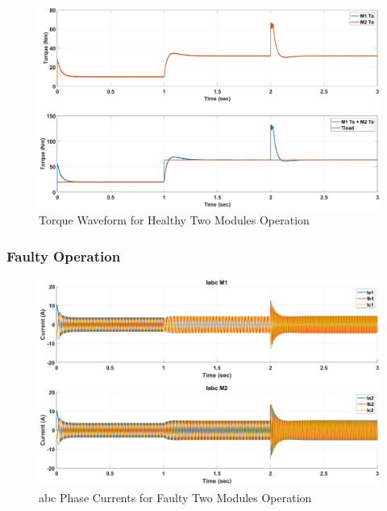 \documentclass{article}
\begin{document}
\begin{figure}[H]
\centering
\includegraphics[scale=0.35]{SimulationResults/two_modules/healthy/tref_tload.eps}
\caption{Torque Waveform for Healthy Two Modules Operation}
\label{fig:TorqueTwoModulesHealthy}
\end{figure}


\subsubsection{Faulty Operation}

\begin{figure}[H]
\centering
\includegraphics[scale=0.35]{SimulationResults/two_modules/faulty/Iabc.eps}
\caption{abc Phase Currents for Faulty Two Modules Operation}
\label{fig:PhaseCurrentsAbcTwoModulesFaulty}
\end{figure}
\end{document}
